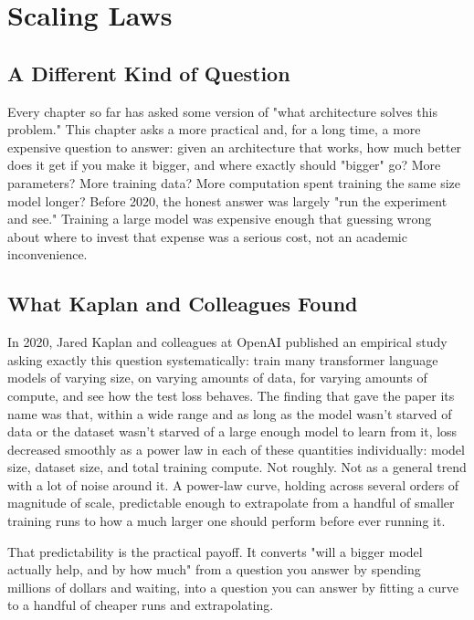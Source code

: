 \chapter{Scaling Laws}

\section*{A Different Kind of Question}

Every chapter so far has asked some version of "what architecture solves this problem." This chapter asks a more practical and, for a long time, a more expensive question to answer: given an architecture that works, how much better does it get if you make it bigger, and where exactly should "bigger" go? More parameters? More training data? More computation spent training the same size model longer? Before 2020, the honest answer was largely "run the experiment and see." Training a large model was expensive enough that guessing wrong about where to invest that expense was a serious cost, not an academic inconvenience.

\section*{What Kaplan and Colleagues Found}

In 2020, Jared Kaplan and colleagues at OpenAI published an empirical study asking exactly this question systematically: train many transformer language models of varying size, on varying amounts of data, for varying amounts of compute, and see how the test loss behaves. The finding that gave the paper its name was that, within a wide range and as long as the model wasn't starved of data or the dataset wasn't starved of a large enough model to learn from it, loss decreased smoothly as a power law in each of these quantities individually: model size, dataset size, and total training compute. Not roughly. Not as a general trend with a lot of noise around it. A power-law curve, holding across several orders of magnitude of scale, predictable enough to extrapolate from a handful of smaller training runs to how a much larger one should perform before ever running it.

That predictability is the practical payoff. It converts "will a bigger model actually help, and by how much" from a question you answer by spending millions of dollars and waiting, into a question you can answer by fitting a curve to a handful of cheaper runs and extrapolating.


